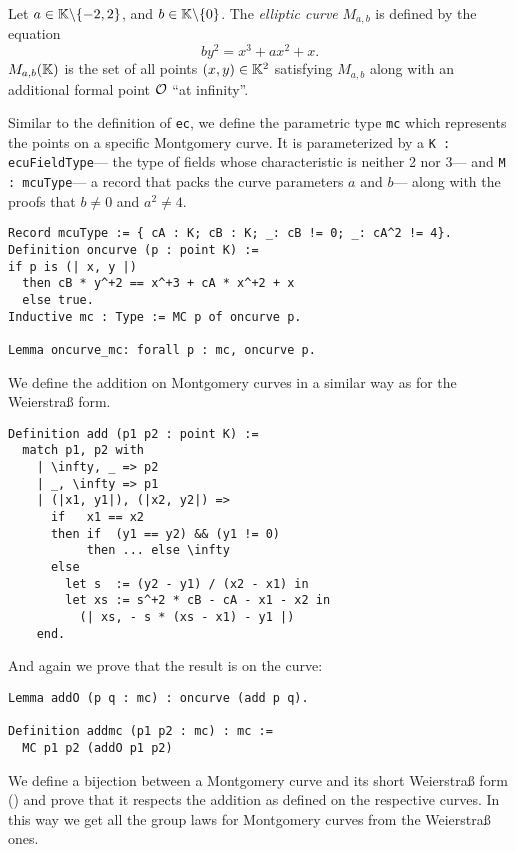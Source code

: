 \begin{dfn}
  Let $a \in \mathbb{K} \backslash \{-2, 2\}$, and $b \in \mathbb{K} \backslash \{ 0\}$.
  The \textit{elliptic curve} $M_{a,b}$ is defined by the equation
  $$by^2 = x^3 + ax^2 + x.$$
  $M_{a,b}(\mathbb{K})$ is the set of all points $(x,y) \in \mathbb{K}^2$ satisfying $M_{a,b}$
  along with an additional formal point $\mathcal{O}$ ``at infinity''.
\end{dfn}
Similar to the definition of \texttt{ec}, we define the parametric type \texttt{mc} which
represents the points on a specific Montgomery curve.
It is parameterized by
a \texttt{K : ecuFieldType}---%
the type of fields whose characteristic is neither 2 nor 3---%
and \texttt{M : mcuType}---%
a record that packs the curve parameters $a$ and $b$---%
along with the proofs that $b \neq 0$ and $a^2 \neq 4$.
\begin{lstlisting}[language=Coq,belowskip=-0.1 \baselineskip]
Record mcuType := { cA : K; cB : K; _: cB != 0; _: cA^2 != 4}.
Definition oncurve (p : point K) :=
if p is (| x, y |)
  then cB * y^+2 == x^+3 + cA * x^+2 + x
  else true.
Inductive mc : Type := MC p of oncurve p.

Lemma oncurve_mc: forall p : mc, oncurve p.
\end{lstlisting}
We define the addition on Montgomery curves in a similar way as for the Weierstra{\ss} form.
\begin{lstlisting}[language=Coq,belowskip=-0.25 \baselineskip]
Definition add (p1 p2 : point K) :=
  match p1, p2 with
    | \infty, _ => p2
    | _, \infty => p1
    | (|x1, y1|), (|x2, y2|) =>
      if   x1 == x2
      then if  (y1 == y2) && (y1 != 0)
           then ... else \infty
      else
        let s  := (y2 - y1) / (x2 - x1) in
        let xs := s^+2 * cB - cA - x1 - x2 in
          (| xs, - s * (xs - x1) - y1 |)
    end.
\end{lstlisting}
And again we prove that the result is on the curve:
\begin{lstlisting}[language=Coq]
Lemma addO (p q : mc) : oncurve (add p q).

Definition addmc (p1 p2 : mc) : mc :=
  MC p1 p2 (addO p1 p2)
\end{lstlisting}

We define a bijection between a Montgomery curve and its short Weierstra{\ss} form
() and prove that it respects the addition as defined on the
respective curves. In this way we get all the group laws for Montgomery curves from the Weierstra{\ss} ones.

